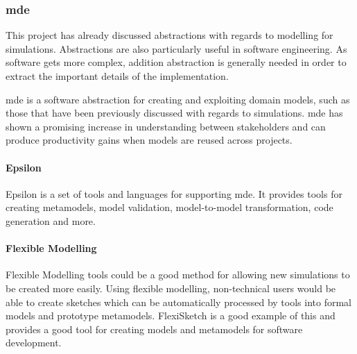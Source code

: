 \documentclass{UoYCSproject}
\begin{document}


\subsubsection{\acrlong{mde}}
This project has already discussed abstractions with regards to modelling for simulations.
Abstractions are also particularly useful in software engineering.
As software gets more complex, addition abstraction is generally needed in order to extract the important details of the implementation\cite[p.24]{csapp}.

\gls{mde} is a software abstraction for creating and exploiting domain models, such as those that have been previously discussed with regards to simulations.
\gls{mde} has shown a promising increase in understanding between stakeholders and can produce productivity gains when models are reused across projects\cite{mde_industry_review}.

\paragraph{Epsilon} Epsilon is a set of tools and languages for supporting \gls{mde}.
It provides tools for creating metamodels, model validation, model-to-model transformation, code generation and more.\cite{epsilon_book}



\paragraph{Flexible Modelling}
Flexible Modelling tools could be a good method for allowing new simulations to be created more easily.
Using flexible modelling, non-technical users would be able to create sketches which can be automatically processed by tools into formal models and prototype metamodels\cite{Paige2017}.
FlexiSketch is a good example of this and provides a good tool for creating models and metamodels for software development\cite{flexisketch}.
\end{document}
